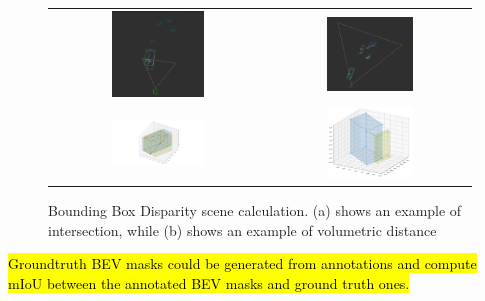 \begin{figure}[h]
    \centering
    \setlength{\tabcolsep}{1pt}  %
    \renewcommand{\arraystretch}{0.5}
    \begin{tabular}{c c}
        
        \includegraphics[width=0.45\textwidth]{images/experiments/frame_0_3d_scene.png} &
        \includegraphics[width=0.45\textwidth]{images/experiments/frame_2_3d_scene.png} \\
        
        \includegraphics[width=0.45\textwidth]{images/experiments/frame_0_3d_bb.png} &
        \includegraphics[width=0.45\textwidth]{images/experiments/frame_2_3d_bb.png} \\

    \end{tabular}
    
    \caption{Bounding Box Disparity scene calculation. (a) shows an example of intersection, while (b) shows an example of volumetric distance}
    \label{fig:bbox_disparity}
\end{figure}






\hl{Groundtruth BEV masks could be generated from annotations and compute mIoU between the annotated BEV masks and ground truth ones.}

